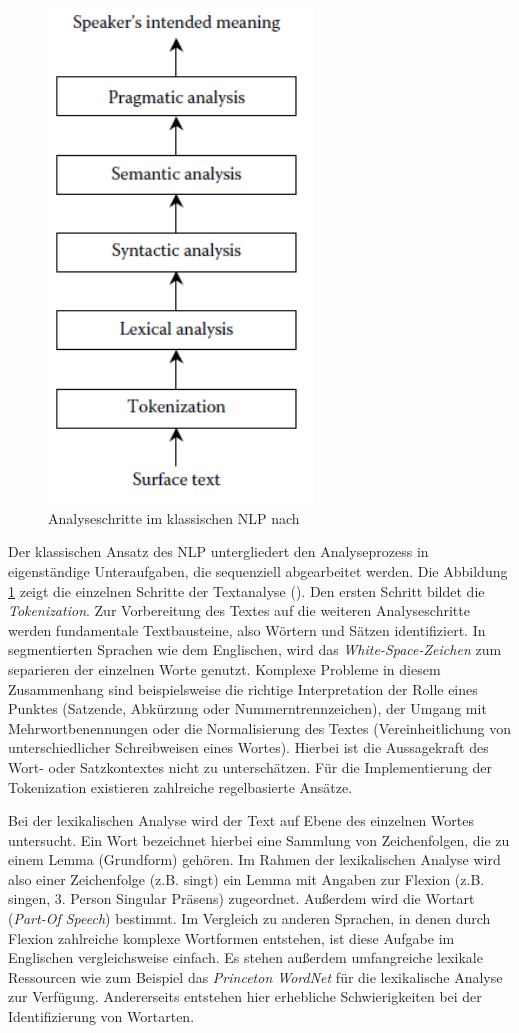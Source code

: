 \begin{figure}
\includegraphics[width=7cm]{pictures/Analyseschritte.png}
\caption{Analyseschritte im klassischen NLP nach \cite[vgl.][4]{DALE}}
\label{fig:STEPS}
\end{figure}
\par
Der klassischen Ansatz des \ac{NLP} untergliedert den Analyseprozess in eigenständige Unteraufgaben, die sequenziell abgearbeitet werden. Die Abbildung \ref{fig:STEPS} zeigt die einzelnen Schritte der Textanalyse (\cite[vgl.][4]{DALE}). 
Den ersten Schritt bildet die \textit{Tokenization}. Zur Vorbereitung des Textes auf die weiteren Analyseschritte werden fundamentale Textbausteine, also Wörtern und Sätzen identifiziert. In segmentierten Sprachen wie dem Englischen, wird das \textit{White-Space-Zeichen} zum separieren der einzelnen Worte genutzt. Komplexe Probleme in diesem Zusammenhang sind beispielsweise die richtige Interpretation der Rolle eines Punktes (Satzende, Abkürzung oder Nummerntrennzeichen), der Umgang mit Mehrwortbenennungen oder die Normalisierung des Textes (Vereinheitlichung von unterschiedlicher Schreibweisen eines Wortes). Hierbei ist die Aussagekraft des Wort- oder Satzkontextes nicht zu unterschätzen. Für die Implementierung der Tokenization existieren zahlreiche regelbasierte Ansätze.
\par
Bei der lexikalischen Analyse wird der Text auf Ebene des einzelnen Wortes untersucht. Ein Wort bezeichnet hierbei eine Sammlung von Zeichenfolgen, die zu einem Lemma (Grundform) gehören. Im Rahmen der lexikalischen Analyse wird also einer Zeichenfolge (z.B. singt) ein Lemma mit Angaben zur Flexion (z.B. singen, 3. Person Singular Präsens) zugeordnet. Außerdem wird die Wortart (\textit{Part-Of Speech}) bestimmt. Im Vergleich zu anderen Sprachen, in denen durch Flexion zahlreiche komplexe Wortformen entstehen, ist diese Aufgabe im Englischen vergleichsweise einfach. Es stehen außerdem umfangreiche lexikale Ressourcen wie zum Beispiel das \textit{Princeton WordNet} für die lexikalische Analyse zur Verfügung. Andererseits entstehen hier erhebliche Schwierigkeiten bei der Identifizierung von Wortarten.
